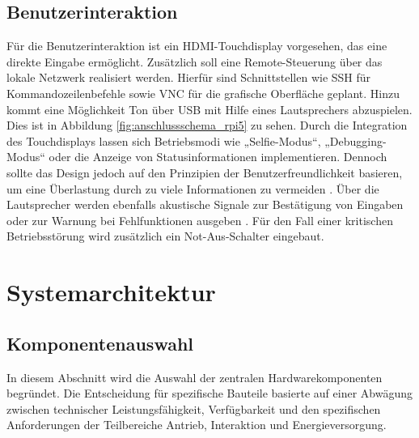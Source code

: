 \subsection{Benutzerinteraktion}
\label{cha:Benutzerinteraktion}

Für die Benutzerinteraktion ist ein HDMI-Touchdisplay vorgesehen, das eine direkte Eingabe ermöglicht. Zusätzlich soll eine Remote-Steuerung über das lokale Netzwerk realisiert werden. Hierfür sind Schnittstellen wie SSH für Kommandozeilenbefehle sowie VNC für die grafische Oberfläche geplant. Hinzu kommt eine Möglichkeit Ton über USB mit Hilfe eines Lautsprechers abzuspielen. Dies ist in Abbildung \ref{fig:anschlussschema_rpi5} zu sehen. Durch die Integration des Touchdisplays lassen sich Betriebsmodi wie „Selfie-Modus“, „Debugging-Modus“ oder die Anzeige von Statusinformationen implementieren. Dennoch sollte das Design jedoch auf den Prinzipien der Benutzerfreundlichkeit basieren, um eine Überlastung durch zu viele Informationen zu vermeiden \autocite{Nielsen.1994}. Über die Lautsprecher werden ebenfalls akustische Signale zur Bestätigung von Eingaben oder zur Warnung bei Fehlfunktionen ausgeben \autocite{Dix.2004}. Für den Fall einer kritischen Betriebsstörung wird zusätzlich ein Not-Aus-Schalter eingebaut.

\section{Systemarchitektur}
\label{cha:Systemarchitektur}

\subsection{Komponentenauswahl}
\label{cha:Komponentenauswahl}

In diesem Abschnitt wird die Auswahl der zentralen Hardwarekomponenten begründet. Die Entscheidung für spezifische Bauteile basierte auf einer Abwägung zwischen technischer Leistungsfähigkeit, Verfügbarkeit und den spezifischen Anforderungen der Teilbereiche Antrieb, Interaktion und Energieversorgung.

